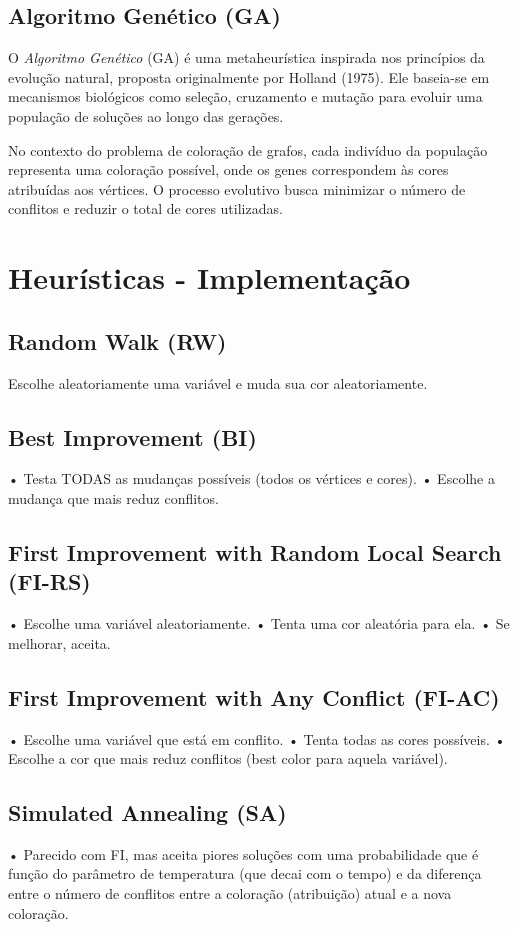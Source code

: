 \documentclass[12pt,a4paper]{article}
\begin{document}
\subsection{Algoritmo Genético (GA)}
O \textit{Algoritmo Genético} (GA) é uma metaheurística inspirada nos princípios da evolução natural, proposta originalmente por Holland (1975). Ele baseia-se em mecanismos biológicos como seleção, cruzamento e mutação para evoluir uma população de soluções ao longo das gerações.

No contexto do problema de coloração de grafos, cada indivíduo da população representa uma coloração possível, onde os genes correspondem às cores atribuídas aos vértices. O processo evolutivo busca minimizar o número de conflitos e reduzir o total de cores utilizadas.


\section{Heurísticas - Implementação}
\subsection{Random Walk (RW)}
Escolhe aleatoriamente uma variável e muda sua cor aleatoriamente.

\subsection{Best Improvement (BI)}
• Testa TODAS as mudanças possíveis (todos os vértices e cores).
• Escolhe a mudança que mais reduz conflitos.

\subsection{First Improvement with Random Local Search (FI-RS)}
• Escolhe uma variável aleatoriamente.
• Tenta uma cor aleatória para ela.
• Se melhorar, aceita.

\subsection{First Improvement with Any Conflict (FI-AC)}
• Escolhe uma variável que está em conflito.
• Tenta todas as cores possíveis.
• Escolhe a cor que mais reduz conflitos (best color para aquela variável).

\subsection{Simulated Annealing (SA)}
• Parecido com FI, mas aceita piores soluções com uma probabilidade que é
função do parâmetro de temperatura (que decai com o tempo) e da diferença
entre o número de conflitos entre a coloração (atribuição) atual e a nova
coloração.
\end{document}
